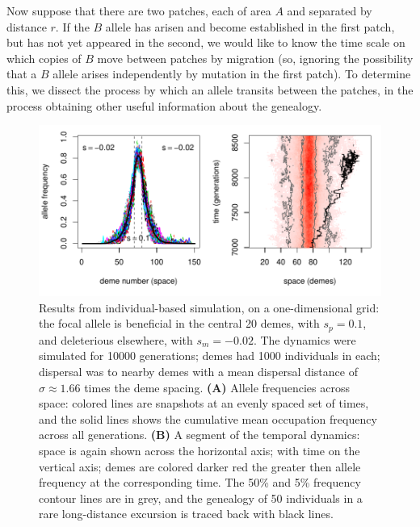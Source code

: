 \documentclass{article}
\begin{document}
Now suppose that there are two patches, each of area $A$ and separated by distance $r$. 
If the $B$ allele has arisen and become established in the first patch, but has not yet appeared in the second,
we would like to know the time scale on which copies of $B$ move between patches by migration
(so, ignoring the possibility that a $B$ allele arises independently by mutation in the first patch).
To determine this, we dissect the process by which an allele transits between the patches,
in the process obtaining other useful information about the genealogy.

\begin{figure}[ht!]
  \begin{center}
    \includegraphics{sim-snapshots}
  \end{center}
  \label{fig:sim_snapshots}
  \caption{
  Results from individual-based simulation, on a one-dimensional grid:
  the focal allele is beneficial in the central 20 demes, with $s_p=0.1$,
  and deleterious elsewhere, with $s_m=-0.02$.
  The dynamics were simulated for 10000 generations; demes had 1000 individuals in each;
  dispersal was to nearby demes with a mean dispersal distance of $\sigma \approx 1.66$  times the deme spacing.
  \textbf{(A)} Allele frequencies across space: colored lines are snapshots at an evenly spaced set of times,
  and the solid lines shows the cumulative mean occupation frequency across all generations.
  \textbf{(B)} A segment of the temporal dynamics: space is again shown across the horizontal axis;
  with time on the vertical axis; demes are colored darker red the greater then allele frequency at the corresponding time.
  The 50\% and 5\% frequency contour lines are in grey,
  and the genealogy of 50 individuals in a rare long-distance excursion is traced back with black lines.
  }
\end{figure}
\end{document}

